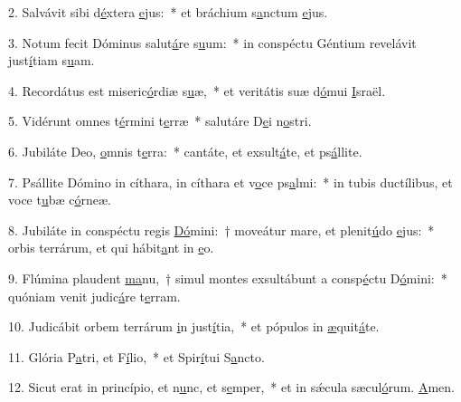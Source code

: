 2. Salvávit sibi d\uline{é}xtera \uline{e}jus:~* et bráchium s\uline{a}nctum \uline{e}jus.\par 
3. Notum fecit Dóminus salut\uline{á}re s\uline{u}um:~* in conspéctu Géntium revelávit just\uline{í}tiam s\uline{u}am.\par 
4. Recordátus est miseric\uline{ó}rdiæ s\uline{u}æ,~* et veritátis suæ d\uline{ó}mui \uline{I}sraël.\par 
5. Vidérunt omnes t\uline{é}rmini t\uline{e}rræ~* salutáre D\uline{e}i n\uline{o}stri.\par 
6. Jubiláte Deo, \uline{o}mnis t\uline{e}rra:~* cantáte, et exsult\uline{á}te, et ps\uline{á}llite.\par 
7. Psállite Dómino in cíthara, in cíthara et v\uline{o}ce ps\uline{a}lmi:~* in tubis ductílibus, et voce t\uline{u}bæ c\uline{ó}rneæ.\par 
8. Jubiláte in conspéctu regis \uline{Dó}mini:~† moveátur mare, et plenit\uline{ú}do \uline{e}jus:~* orbis terrárum, et qui hábit\uline{a}nt in \uline{e}o.\par 
9. Flúmina plaudent \uline{ma}nu,~† simul montes exsultábunt a consp\uline{é}ctu D\uline{ó}mini:~* quóniam venit judic\uline{á}re t\uline{e}rram.\par 
10. Judicábit orbem terrárum \uline{i}n just\uline{í}tia,~* et pópulos in \uline{æ}quit\uline{á}te.\par 
11. Glória P\uline{a}tri, et F\uline{í}lio,~* et Spir\uline{í}tui S\uline{a}ncto.\par 
12. Sicut erat in princípio, et n\uline{u}nc, et s\uline{e}mper,~* et in sǽcula sæcul\uline{ó}rum. \uline{A}men.\par 
